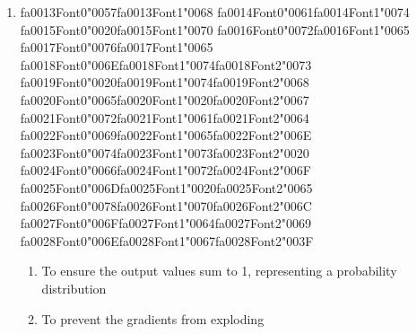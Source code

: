 \documentclass[12pt]{article}
\begin{document}
\begin{enumerate}[label=Q\arabic*.]
\begin{enumerate}[label=(\Alph*)]
    \item To store the final output of the entire sequence.
    \item To act as a memory that carries information from previous time steps
    \item To calculate the loss function for the current word
    \item To normalize the input embeddings
\end{enumerate}
\item {\csname fa0013Font0\endcsname\char"0057}{\csname fa0013Font1\endcsname\char"0068} {\csname fa0014Font0\endcsname\char"0061}{\csname fa0014Font1\endcsname\char"0074} {\csname fa0015Font0\endcsname\char"0020}{\csname fa0015Font1\endcsname\char"0070} {\csname fa0016Font0\endcsname\char"0072}{\csname fa0016Font1\endcsname\char"0065} {\csname fa0017Font0\endcsname\char"0076}{\csname fa0017Font1\endcsname\char"0065} {\csname fa0018Font0\endcsname\char"006E}{\csname fa0018Font1\endcsname\char"0074}{\csname fa0018Font2\endcsname\char"0073} {\csname fa0019Font0\endcsname\char"0020}{\csname fa0019Font1\endcsname\char"0074}{\csname fa0019Font2\endcsname\char"0068} {\csname fa0020Font0\endcsname\char"0065}{\csname fa0020Font1\endcsname\char"0020}{\csname fa0020Font2\endcsname\char"0067} {\csname fa0021Font0\endcsname\char"0072}{\csname fa0021Font1\endcsname\char"0061}{\csname fa0021Font2\endcsname\char"0064} {\csname fa0022Font0\endcsname\char"0069}{\csname fa0022Font1\endcsname\char"0065}{\csname fa0022Font2\endcsname\char"006E} {\csname fa0023Font0\endcsname\char"0074}{\csname fa0023Font1\endcsname\char"0073}{\csname fa0023Font2\endcsname\char"0020} {\csname fa0024Font0\endcsname\char"0066}{\csname fa0024Font1\endcsname\char"0072}{\csname fa0024Font2\endcsname\char"006F} {\csname fa0025Font0\endcsname\char"006D}{\csname fa0025Font1\endcsname\char"0020}{\csname fa0025Font2\endcsname\char"0065} {\csname fa0026Font0\endcsname\char"0078}{\csname fa0026Font1\endcsname\char"0070}{\csname fa0026Font2\endcsname\char"006C} {\csname fa0027Font0\endcsname\char"006F}{\csname fa0027Font1\endcsname\char"0064}{\csname fa0027Font2\endcsname\char"0069} {\csname fa0028Font0\endcsname\char"006E}{\csname fa0028Font1\endcsname\char"0067}{\csname fa0028Font2\endcsname\char"003F}
\begin{enumerate}[label=(\Alph*)]
    \item To ensure the output values sum to 1, representing a probability distribution
    \item To prevent the gradients from exploding

\end{enumerate}
\end{enumerate}
\end{document}
